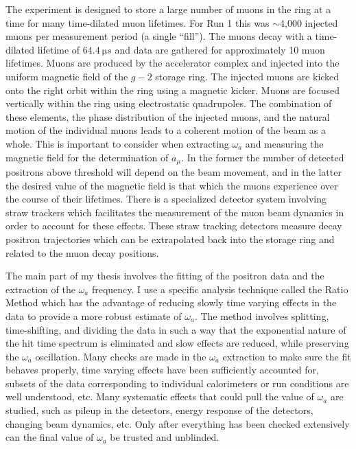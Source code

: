 \documentclass[12pt,letterpaper]{article}
\def\wa{$\omega_{a}$\xspace}
\def\gmtwo{$g-2$\xspace}
\begin{document}
The experiment is designed to store a large number of muons in the ring at a time for many time-dilated muon lifetimes. For Run 1 this was $\sim$4,000 injected muons per measurement period (a single ``fill''). The muons decay with a time-dilated lifetime of $\SI{64.4}{\micro s}$ and data are gathered for approximately 10 muon lifetimes. Muons are produced by the accelerator complex and injected into the uniform magnetic field of the \gmtwo storage ring. The injected muons are kicked onto the right orbit within the ring using a magnetic kicker. Muons are focused vertically within the ring using electrostatic quadrupoles. The combination of these elements, the phase distribution of the injected muons, and the natural motion of the individual muons leads to a coherent motion of the beam as a whole. This is important to consider when extracting \wa and measuring the magnetic field for the determination of $a_{\mu}$. In the former the number of detected positrons above threshold will depend on the beam movement, and in the latter the desired value of the magnetic field is that which the muons experience over the course of their lifetimes. There is a specialized detector system involving straw trackers which facilitates the measurement of the muon beam dynamics in order to account for these effects. These straw tracking detectors measure decay positron trajectories which can be extrapolated back into the storage ring and related to the muon decay positions.


The main part of my thesis involves the fitting of the positron data and the extraction of the \wa frequency. I use a specific analysis technique called the Ratio Method which has the advantage of reducing slowly time varying effects in the data to provide a more robust estimate of \wa. The method involves splitting, time-shifting, and dividing the data in such a way that the exponential nature of the hit time spectrum is eliminated and slow effects are reduced, while preserving the \wa oscillation. Many checks are made in the \wa extraction to make sure the fit behaves properly, time varying effects have been sufficiently accounted for, subsets of the data corresponding to individual calorimeters or run conditions are well understood, etc. Many systematic effects that could pull the value of \wa are studied, such as pileup in the detectors, energy response of the detectors, changing beam dynamics, etc. Only after everything has been checked extensively can the final value of \wa be trusted and unblinded. 
\end{document}
